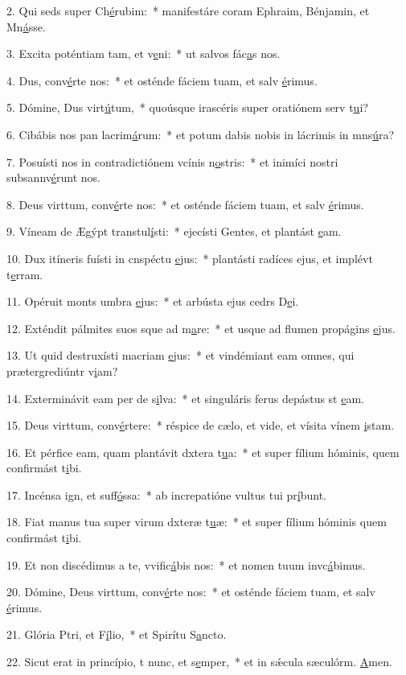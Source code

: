 2. Qui seds super Ch\uline{é}rubim:~* manifestáre coram Ephraim, Bénjamin, et Mn\uline{á}sse.\par 
3. Excita poténtiam tam, et v\uline{e}ni:~* ut salvos fác\uline{a}s nos.\par 
4. Dus, conv\uline{é}rte nos:~* et osténde fáciem tuam, et salv \uline{é}rimus.\par 
5. Dómine, Dus virt\uline{ú}tum,~* quoúsque irascéris super oratiónem serv t\uline{u}i?\par 
6. Cibábis nos pan lacrim\uline{á}rum:~* et potum dabis nobis in lácrimis in mns\uline{ú}ra?\par 
7. Posuísti nos in contradictiónem vcínis n\uline{o}stris:~* et inimíci nostri subsannv\uline{é}runt nos.\par 
8. Deus virttum, conv\uline{é}rte nos:~* et osténde fáciem tuam, et salv \uline{é}rimus.\par 
9. Víneam de Ægýpt transtul\uline{í}sti:~* ejecísti Gentes, et plantást \uline{e}am.\par 
10. Dux itíneris fuísti in cnspéctu \uline{e}jus:~* plantásti radíces ejus, et implévt t\uline{e}rram.\par 
11. Opéruit monts umbra \uline{e}jus:~* et arbústa ejus cedrs D\uline{e}i.\par 
12. Exténdit pálmites suos sque ad m\uline{a}re:~* et usque ad flumen propágins \uline{e}jus.\par 
13. Ut quid destruxísti macriam \uline{e}jus:~* et vindémiant eam omnes, qui prætergrediúntr v\uline{i}am?\par 
14. Exterminávit eam per de s\uline{i}lva:~* et singuláris ferus depástus st \uline{e}am.\par 
15. Deus virttum, conv\uline{é}rtere:~* réspice de cælo, et vide, et vísita vínem \uline{i}stam.\par 
16. Et pérfice eam, quam plantávit dxtera t\uline{u}a:~* et super fílium hóminis, quem confirmást t\uline{i}bi.\par 
17. Incénsa ign, et suff\uline{ó}ssa:~* ab increpatióne vultus tui pr\uline{í}bunt.\par 
18. Fiat manus tua super virum dxteræ t\uline{u}æ:~* et super fílium hóminis quem confirmást t\uline{i}bi.\par 
19. Et non discédimus a te, vvific\uline{á}bis nos:~* et nomen tuum invc\uline{á}bimus.\par 
20. Dómine, Deus virttum, conv\uline{é}rte nos:~* et osténde fáciem tuam, et salv \uline{é}rimus.\par 
21. Glória Ptri, et F\uline{í}lio,~* et Spirítu S\uline{a}ncto.\par 
22. Sicut erat in princípio, t nunc, et s\uline{e}mper,~* et in sǽcula sæculórm. \uline{A}men.\par 
